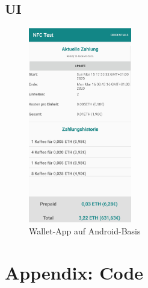 \clearpage

\section{UI}
\label{sec:appendix:implementation:ui}
\begin{figure}[h]
 \centering
 \includegraphics[width=0.4\textwidth]{gfx/screenshots/smartphone.jpg}
 \caption{Wallet-App auf Android-Basis}
 \label{fig:appendix:ui:smartphone}
\end{figure}
\newpage

\chapter{Appendix: Code}
\label{ch:appendix:code}




